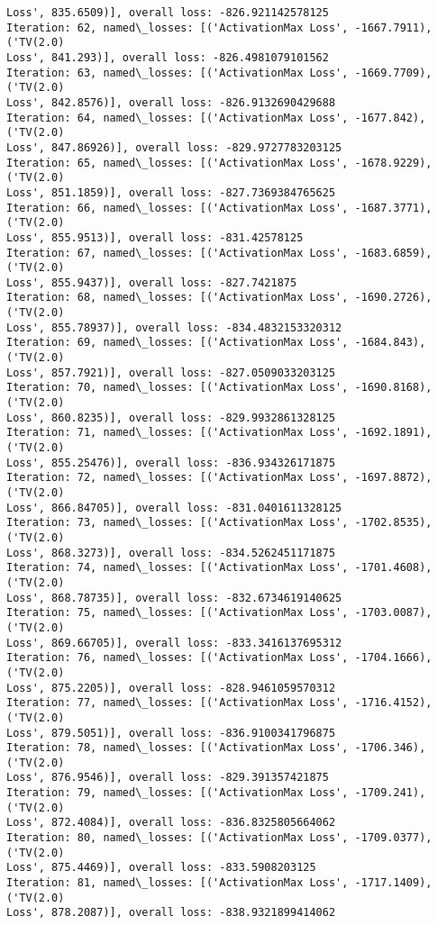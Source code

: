 \documentclass[10pt]{article}
\begin{document}
\begin{Verbatim}[commandchars=\\\{\}]
Loss', 835.6509)], overall loss: -826.921142578125
Iteration: 62, named\_losses: [('ActivationMax Loss', -1667.7911), ('TV(2.0)
Loss', 841.293)], overall loss: -826.4981079101562
Iteration: 63, named\_losses: [('ActivationMax Loss', -1669.7709), ('TV(2.0)
Loss', 842.8576)], overall loss: -826.9132690429688
Iteration: 64, named\_losses: [('ActivationMax Loss', -1677.842), ('TV(2.0)
Loss', 847.86926)], overall loss: -829.9727783203125
Iteration: 65, named\_losses: [('ActivationMax Loss', -1678.9229), ('TV(2.0)
Loss', 851.1859)], overall loss: -827.7369384765625
Iteration: 66, named\_losses: [('ActivationMax Loss', -1687.3771), ('TV(2.0)
Loss', 855.9513)], overall loss: -831.42578125
Iteration: 67, named\_losses: [('ActivationMax Loss', -1683.6859), ('TV(2.0)
Loss', 855.9437)], overall loss: -827.7421875
Iteration: 68, named\_losses: [('ActivationMax Loss', -1690.2726), ('TV(2.0)
Loss', 855.78937)], overall loss: -834.4832153320312
Iteration: 69, named\_losses: [('ActivationMax Loss', -1684.843), ('TV(2.0)
Loss', 857.7921)], overall loss: -827.0509033203125
Iteration: 70, named\_losses: [('ActivationMax Loss', -1690.8168), ('TV(2.0)
Loss', 860.8235)], overall loss: -829.9932861328125
Iteration: 71, named\_losses: [('ActivationMax Loss', -1692.1891), ('TV(2.0)
Loss', 855.25476)], overall loss: -836.934326171875
Iteration: 72, named\_losses: [('ActivationMax Loss', -1697.8872), ('TV(2.0)
Loss', 866.84705)], overall loss: -831.0401611328125
Iteration: 73, named\_losses: [('ActivationMax Loss', -1702.8535), ('TV(2.0)
Loss', 868.3273)], overall loss: -834.5262451171875
Iteration: 74, named\_losses: [('ActivationMax Loss', -1701.4608), ('TV(2.0)
Loss', 868.78735)], overall loss: -832.6734619140625
Iteration: 75, named\_losses: [('ActivationMax Loss', -1703.0087), ('TV(2.0)
Loss', 869.66705)], overall loss: -833.3416137695312
Iteration: 76, named\_losses: [('ActivationMax Loss', -1704.1666), ('TV(2.0)
Loss', 875.2205)], overall loss: -828.9461059570312
Iteration: 77, named\_losses: [('ActivationMax Loss', -1716.4152), ('TV(2.0)
Loss', 879.5051)], overall loss: -836.9100341796875
Iteration: 78, named\_losses: [('ActivationMax Loss', -1706.346), ('TV(2.0)
Loss', 876.9546)], overall loss: -829.391357421875
Iteration: 79, named\_losses: [('ActivationMax Loss', -1709.241), ('TV(2.0)
Loss', 872.4084)], overall loss: -836.8325805664062
Iteration: 80, named\_losses: [('ActivationMax Loss', -1709.0377), ('TV(2.0)
Loss', 875.4469)], overall loss: -833.5908203125
Iteration: 81, named\_losses: [('ActivationMax Loss', -1717.1409), ('TV(2.0)
Loss', 878.2087)], overall loss: -838.9321899414062

\end{Verbatim}
\end{document}
